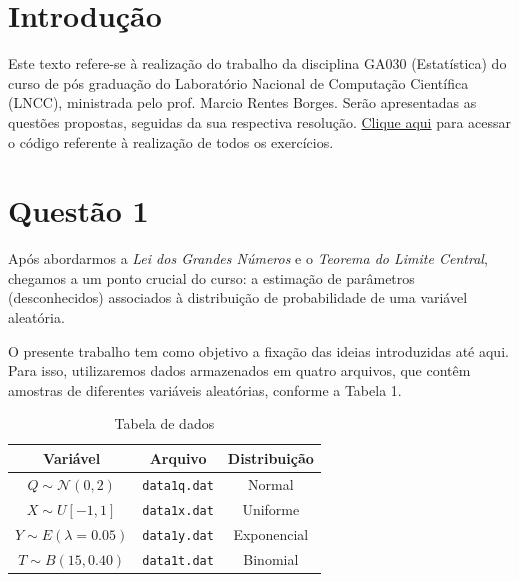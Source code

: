 \documentclass[]{abntex2}
\begin{document}
\frenchspacing 

\maketitle

\section*{\textbf{Introdução}}

Este texto refere-se à realização do trabalho da disciplina GA030 (Estatística) do curso de pós graduação do Laboratório Nacional de Computação Científica (LNCC), ministrada pelo prof. Marcio Rentes Borges. Serão apresentadas as questões propostas, seguidas da sua respectiva resolução. \href{https://github.com/lorran-araujo/LNCC/blob/main/disciplinas/estatistica/trab1/trab.ipynb}{Clique aqui} para acessar o código referente à realização de todos os exercícios.

\section*{\textbf{Questão 1}}
\noindent Após abordarmos a \textit{Lei dos Grandes Números} e o \textit{Teorema do Limite Central}, chegamos a um ponto crucial do curso: a estimação de parâmetros (desconhecidos) associados à distribuição de probabilidade de uma variável aleatória.

\noindent O presente trabalho tem como objetivo a fixação das ideias introduzidas até aqui. Para isso, utilizaremos dados armazenados em quatro arquivos, que contêm amostras de diferentes variáveis aleatórias, conforme a Tabela 1.

\begin{table}[H]
    \centering
    \begin{tabular}{|c|c|c|}
        \hline
        \textbf{Variável} & \textbf{Arquivo} & \textbf{Distribuição} \\
        \hline
        $Q \sim \mathcal{N}(0, 2)$ & \texttt{data1q.dat} & Normal \\
        $X \sim U[-1, 1]$ & \texttt{data1x.dat} & Uniforme \\
        $Y \sim E(\lambda = 0.05)$ & \texttt{data1y.dat} & Exponencial \\
        $T \sim B(15, 0.40)$ & \texttt{data1t.dat} & Binomial \\
        \hline
    \end{tabular}
    \caption{Tabela de dados}
    \label{tab:dados}
\end{table}
\end{document}

